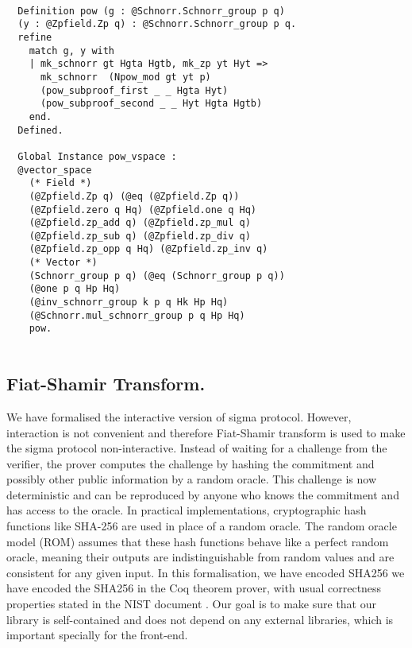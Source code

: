 \documentclass[conference,compsoc]{IEEEtran}
\begin{document}
\begin{lstlisting}[frame=single, language=Coq, caption={Vector Space Instantiation},
  label={vec_space},captionpos=t, basicstyle=\ttfamily\footnotesize,
  abovecaptionskip=-\medskipamount]

  Definition pow (g : @Schnorr.Schnorr_group p q) 
  (y : @Zpfield.Zp q) : @Schnorr.Schnorr_group p q.
  refine 
    match g, y with 
    | mk_schnorr gt Hgta Hgtb, mk_zp yt Hyt => 
      mk_schnorr  (Npow_mod gt yt p) 
      (pow_subproof_first _ _ Hgta Hyt)
      (pow_subproof_second _ _ Hyt Hgta Hgtb)
    end.
  Defined.

  Global Instance pow_vspace : 
  @vector_space 
    (* Field *)
    (@Zpfield.Zp q) (@eq (@Zpfield.Zp q))
    (@Zpfield.zero q Hq) (@Zpfield.one q Hq)
    (@Zpfield.zp_add q) (@Zpfield.zp_mul q)
    (@Zpfield.zp_sub q) (@Zpfield.zp_div q)
    (@Zpfield.zp_opp q Hq) (@Zpfield.zp_inv q)
    (* Vector *)
    (Schnorr_group p q) (@eq (Schnorr_group p q))
    (@one p q Hp Hq) 
    (@inv_schnorr_group k p q Hk Hp Hq)
    (@Schnorr.mul_schnorr_group p q Hp Hq)
    pow.
  
\end{lstlisting}
  
  
 
\subsection{Fiat-Shamir Transform.}
 We have formalised the interactive version of sigma protocol. However,
 interaction is not convenient and therefore
 Fiat-Shamir transform is used to make the sigma protocol non-interactive. 
 Instead of waiting for a challenge from the verifier, the prover computes 
 the challenge by hashing the commitment and possibly other public 
 information by a random oracle.
 This challenge is now deterministic and can be reproduced by anyone 
 who knows the commitment and has access to the oracle. 
 In practical implementations, cryptographic hash functions like SHA-256 are 
 used in place of a random oracle. The random oracle model (ROM) assumes that these hash functions 
 behave like a perfect random oracle, meaning their outputs are 
 indistinguishable from random values and are consistent for any given input.
 In this formalisation, we have encoded SHA256 we have encoded the SHA256 in the Coq 
 theorem prover, with usual correctness properties stated in the NIST document \cite{nist_fips_180_4}.
 Our goal is to make sure that our library is self-contained and does 
 not depend on any external libraries, which is important specially 
 for the front-end.
\end{document}
